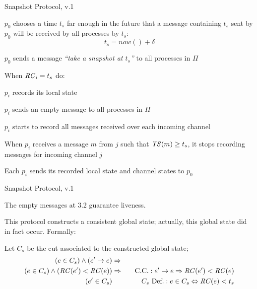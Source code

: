 \begin{frame}{Snapshot Protocol, v.1}

\BEL
\item $p_0$ chooses a time $t_s$ far enough in the future that a message containing $t_s$
  sent by $p_0$ will be received by all processes by $t_s$:
  \[
     t_s = now() + \delta
  \]
\item $p_0$ sends a message \emph{``take a snapshot at $t_s$''} to all processes in $\Pi$
\item When $\mathit{RC}_i=t_s$ do:
  \BE
  \item $p_i$ records its local state
  \item $p_i$ sends an empty message to all processes in $\Pi$
  \item $p_i$ starts to record all messages received over each incoming channel
  \EE
\item When $p_i$ receives a message $m$ from $j$ such that $\mathit{TS}(m) \geq t_s$, it stops recording
  messages for incoming channel $j$
\item Each $p_i$ sends its recorded local state and channel states to $p_0$
\EEL

\end{frame}

\begin{frame}{Snapshot Protocol, v.1}
	
 The empty messages at 3.2 guarantee liveness.

 This protocol constructs a consistent global state;
  actually, this global state did in fact occur. Formally:

Let $C_s$ be the cut associated to the constructed global state;
\begin{eqnarray*}
(e \in C_s) \wedge (e' \rightarrow e) &\Rightarrow& \\
(e \in C_s) \wedge (\mathit{RC}(e') < \mathit{RC}(e)) &\Rightarrow& \quad \mbox{C.C.}:  e' \rightarrow e  \Rightarrow \mathit{RC}(e') < \mathit{RC}(e) \\
(e' \in C_s) && \quad C_s\ \mbox{Def.}: e \in C_s \Leftrightarrow \mathit{RC}(e) < t_s 
\end{eqnarray*}

~

\end{frame}

